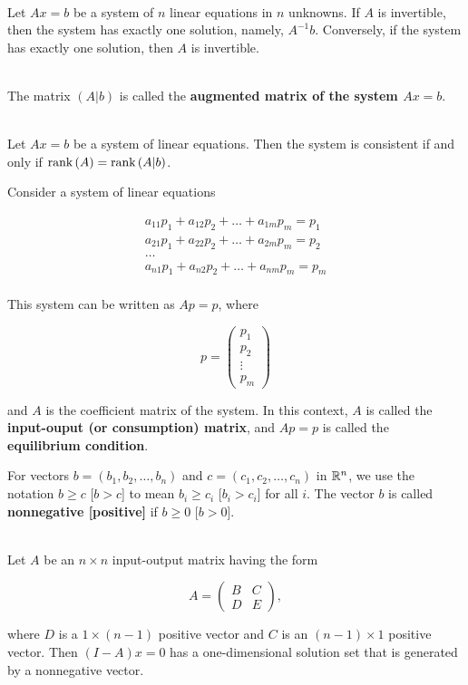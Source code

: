 \begin{theorem}
	\hfill\\
	Let $Ax = b$ be a system of $n$ linear equations in $n$ unknowns. If $A$ is invertible, then the system has exactly one solution, namely, $A^{-1}b$. Conversely, if the system has exactly one solution, then $A$ is invertible.
\end{theorem}

\begin{definition}
	\hfill\\
	The matrix $(A|b)$ is called the \textbf{augmented matrix of the system $Ax = b$}.
\end{definition}

\begin{theorem}
	\hfill\\
	Let $Ax = b$ be a system of linear equations. Then the system is consistent if and only if $\text{rank}\left(A\right) = \text{rank}\left(A|b\right)$.
\end{theorem}

\begin{definition}
	Consider a system of linear equations
	
	\[\begin{split}
		a_{11}p_1 + a_{12}p_2 + \dots + a_{1m}p_m = p_1 \\
		a_{21}p_1 + a_{22}p_2 + \dots + a_{2m}p_m = p_2 \\
		\dots \\
		a_{n1}p_1 + a_{n2}p_2 + \dots + a_{nm}p_m = p_m \\
	\end{split}\]
	
	This system can be written as $Ap = p$, where 
	
	\[p = \begin{pmatrix}
		p_1 \\ p_2 \\ \vdots \\ p_m
	\end{pmatrix}\]
	
	and $A$ is the coefficient matrix of the system. In this context, $A$ is called the \textbf{input-ouput (or consumption) matrix}, and $Ap = p$ is called the \textbf{equilibrium condition}.
	
	For vectors $b = (b_1, b_2, \dots, b_n)$ and $c = (c_1, c_2, \dots, c_n)$ in $\mathbb{R}^n$, we use the notation $b \geq c$ [$b > c$] to mean $b_i \geq c_i$ [$b_i > c_i$] for all $i$. The vector $b$ is called \textbf{nonnegative [positive]} if $b \geq 0$ [$b > 0$].
\end{definition}

\begin{theorem}
	\hfill\\
	Let $A$ be an $n \times n$ input-output matrix having the form
	
	\[A = \begin{pmatrix}
		B & C \\
		D & E
	\end{pmatrix},\]
	
	where $D$ is a $1 \times (n -1)$ positive vector and $C$ is an $(n-1)\times 1$ positive vector. Then $(I -A)x = 0$ has a one-dimensional solution set that is generated by a nonnegative vector.
\end{theorem}